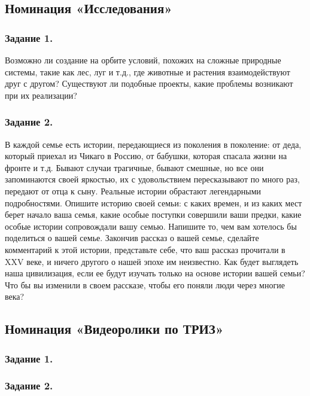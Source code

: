 \documentclass[11pt,a4paper]{article}
\begin{document}
\CosmicInventions

\subsection{Номинация «Исследования»}

\subsubsection*{Задание 1.}

\AnimalsInCosmos

Возможно ли создание на орбите условий, похожих на сложные природные системы,
такие как лес, луг и т.д., где животные и растения взаимодействуют друг с
другом? Существуют ли подобные проекты, какие проблемы возникают при их
реализации?

\subsubsection*{Задание 2.}
В каждой семье есть истории, передающиеся из поколения в поколение: от деда,
который приехал из Чикаго в Россию, от бабушки, которая спасала жизни на
фронте и т.д. Бывают случаи трагичные, бывают смешные, но все они запоминаются
своей яркостью, их с удовольствием пересказывают по много раз, передают от
отца к сыну. Реальные истории обрастают легендарными подробностями. Опишите
историю своей семьи: с каких времен, и из каких мест берет начало ваша семья,
какие особые поступки совершили ваши предки, какие особые истории сопровождали
вашу семью. Напишите то, чем вам хотелось бы поделиться о вашей семье.
Закончив рассказ о вашей семье, сделайте комментарий к этой истории,
представьте себе, что ваш рассказ прочитали в XXV веке, и ничего другого о
нашей эпохе им неизвестно. Как будет выглядеть наша цивилизация, если ее будут
изучать только на основе истории вашей семьи? Что бы вы изменили в своем
рассказе, чтобы его поняли люди через многие века?
\clearpage

\subsection{Номинация «Видеоролики по ТРИЗ»}
\subsubsection*{Задание 1.}\VideoOne
\subsubsection*{Задание 2.}\VideoTwo
\end{document}
